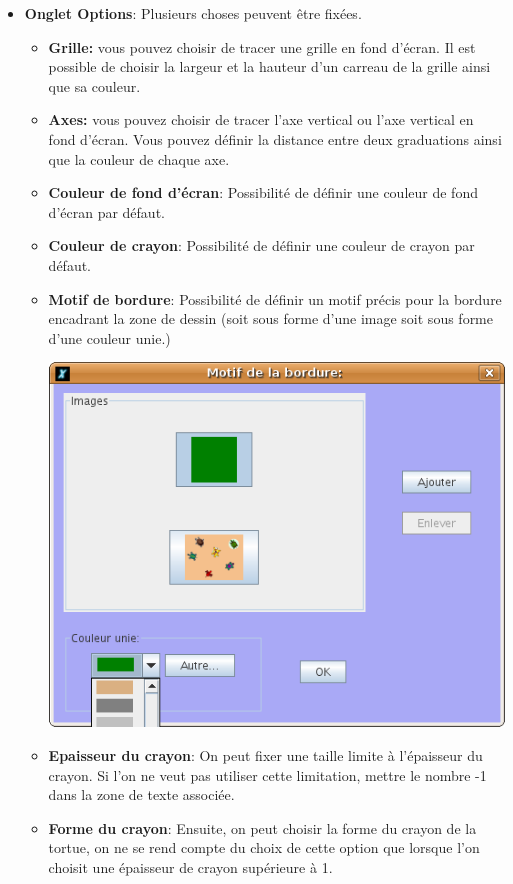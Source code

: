 \begin{itemize}
\begin{itemize}
\begin{center}
	\end{center}
	\item \textbf{Onglet Options}: Plusieurs choses peuvent être fixées. 
	\begin{itemize}
		\item \textbf{Grille:} vous pouvez choisir de tracer une grille en fond d'écran. Il est possible de choisir la largeur et la hauteur d'un carreau de la grille ainsi que sa couleur.
		\item \textbf{Axes:} vous pouvez choisir de tracer l'axe vertical ou l'axe vertical en fond d'écran. Vous pouvez définir la distance entre deux graduations ainsi que la couleur de chaque axe.
		\item \textbf{Couleur de fond d'écran}: Possibilité de définir une couleur de fond d'écran par défaut.
		\item \textbf{Couleur de crayon}: Possibilité de définir une couleur de crayon par défaut.
		\item \textbf{Motif de bordure}: Possibilité de définir un motif précis pour la bordure encadrant la zone de dessin (soit sous forme d'une image soit sous forme d'une couleur unie.)
	\begin{center}
 		\includegraphics[scale=0.4]{images/CaptureBordure.png}
	\end{center}
		\item \textbf{Epaisseur du crayon}: On peut fixer une taille limite à l'épaisseur du crayon. Si l'on ne veut pas utiliser cette limitation, mettre le nombre -1 dans la zone de texte associée.
		\item \textbf{Forme du crayon}: Ensuite, on peut choisir la forme du crayon de la tortue, on ne se rend compte du choix de cette option que lorsque l'on choisit une épaisseur de crayon supérieure à 1.

\end{itemize}
\end{itemize}
\end{itemize}
